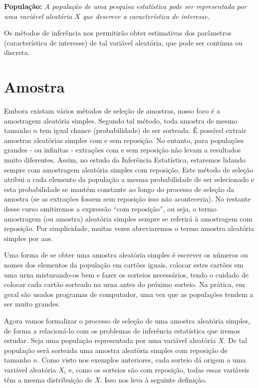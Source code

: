 \documentclass[
]{book}
\begin{document}
\textbf{População:} \emph{A população de uma pesquisa estatística pode ser representada por uma variável aleatória $X$ que descreve a característica de interesse.}

Os métodos de inferência nos permitirão obter estimativas dos parâmetros (característica de interesse) de tal variável aleatória, que pode ser contínua ou discreta.

\hypertarget{amostra}{%
\section{Amostra}\label{amostra}}

Embora existam vários métodos de seleção de amostras, nosso foco é a amostragem aleatória simples. Segundo tal método, toda amostra de mesmo tamanho \(n\) tem igual chance (probabilidade) de ser sorteada. É possível extrair amostras aleatórias simples com e sem reposição. No entanto, para populações grandes - ou infinitas - extrações com e sem reposição não levam a resultados muito diferentes. Assim, no estudo da Inferência Estatística, estaremos lidando sempre com amostragem aleatória simples com reposição. Este método de seleção atribui a cada elemento da população a mesma probabilidade de ser selecionado e esta probabilidade se mantém constante ao longo do processo de seleção da amostra (se as extrações fossem sem reposição isso não aconteceria). No restante desse curso omitiremos a expressão ``com reposição'', ou seja, o termo amostragem (ou amostra) aleatória simples sempre se referirá à amostragem com reposição. Por simplicidade, muitas vezes abreviaremos o termo amostra aleatória simples por aas.

Uma forma de se obter uma amostra aleatória simples é escrever os números ou nomes dos elementos da população em cartões iguais, colocar estes cartões em uma urna misturando-os bem e fazer os sorteios necessários, tendo o cuidado de colocar cada cartão sorteado na urna antes do próximo sorteio. Na prática, em geral são usados programas de computador, uma vez que as populações tendem a ser muito grandes.

Agora vamos formalizar o processo de seleção de uma amostra aleatória simples, de forma a relacioná-lo com os problemas de inferência estatística que iremos estudar. Seja uma população representada por uma variável aleatória \(X\). De tal população será sorteada uma amostra aleatória simples com reposição de tamanho \(n\). Como visto nos exemplos anteriores, cada sorteio dá origem a uma variável aleatória \(X_i\) e, como os sorteios são com reposição, todas essas variáveis têm a mesma distribuição de \(X\). Isso nos leva à seguinte definição.
\end{document}
